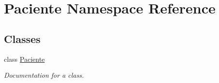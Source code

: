 \hypertarget{namespace_paciente}{}\section{Paciente Namespace Reference}
\label{namespace_paciente}
\subsection*{Classes}
\begin{DoxyCompactItemize}
\item 
class \mbox{\hyperlink{class_paciente_1_1_paciente}{Paciente}}
\begin{DoxyCompactList}\small\item\em Documentation for a class. \end{DoxyCompactList}\end{DoxyCompactItemize}
